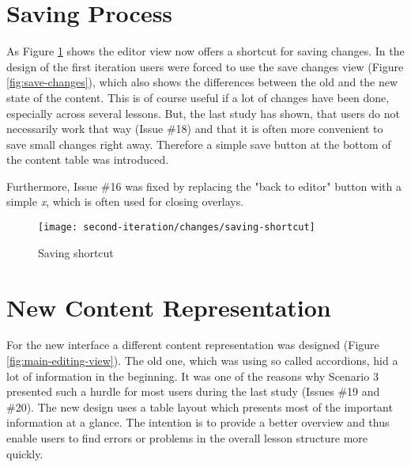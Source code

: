 \section{Saving Process}
As Figure \ref{fig:saving-shortcut} shows the editor view now offers a shortcut for saving changes. In the design of the first iteration users were forced to use the save changes view (Figure \ref{fig:save-changes}), which also shows the differences between the old and the new state of the content. This is of course useful if a lot of changes have been done, especially across several lessons. But, the last study has shown, that users do not necessarily work that way (Issue \#18) and that it is often more convenient to save small changes right away. Therefore a simple save button at the bottom of the content table was introduced.

Furthermore, Issue \#16 was fixed by replacing the "back to editor" button with a simple \emph{x}, which is often used for closing overlays.

\begin{figure}[h!]
 \centering
 \texttt{[image: second-iteration/changes/saving-shortcut]}
 \caption{Saving shortcut}
 \label{fig:saving-shortcut}
\end{figure}

\section{New Content Representation}
For the new interface a different content representation was designed (Figure \ref{fig:main-editing-view}). The old one, which was using so called accordions, hid a lot of information in the beginning. It was one of the reasons why Scenario 3 presented such a hurdle for most users during the last study (Issues \#19 and \#20). The new design uses a table layout which presents most of the important information at a glance. The intention is to provide a better overview and thus enable users to find errors or problems in the overall lesson structure more quickly.


